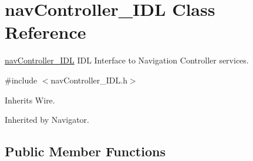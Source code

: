 \section{nav\+Controller\+\_\+\+I\+DL Class Reference}
\label{classnavController__IDL}


\mbox{\hyperlink{classnavController__IDL}{nav\+Controller\+\_\+\+I\+DL}} I\+DL Interface to Navigation Controller services.  




{\ttfamily \#include $<$nav\+Controller\+\_\+\+I\+D\+L.\+h$>$}



Inherits Wire.



Inherited by Navigator.

\subsection*{Public Member Functions}
